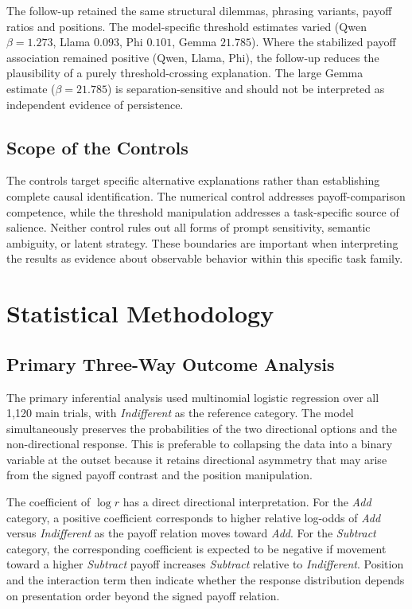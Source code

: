 \documentclass[10pt,journal,compsoc]{IEEEtran}
\begin{document}
The follow-up retained the same structural dilemmas, phrasing variants, payoff ratios and positions. The model-specific threshold estimates varied (Qwen $\beta=1.273$, Llama $0.093$, Phi $0.101$, Gemma $21.785$). Where the stabilized payoff association remained positive (Qwen, Llama, Phi), the follow-up reduces the plausibility of a purely threshold-crossing explanation. The large Gemma estimate ($\beta=21.785$) is separation-sensitive and should not be interpreted as independent evidence of persistence.

\subsection{Scope of the Controls}
The controls target specific alternative explanations rather than establishing complete causal identification. The numerical control addresses payoff-comparison competence, while the threshold manipulation addresses a task-specific source of salience. Neither control rules out all forms of prompt sensitivity, semantic ambiguity, or latent strategy. These boundaries are important when interpreting the results as evidence about observable behavior within this specific task family.

\section{Statistical Methodology}
\label{sec:statistics}

\subsection{Primary Three-Way Outcome Analysis}
The primary inferential analysis used multinomial logistic regression over all 1,120 main trials, with \textit{Indifferent} as the reference category. The model simultaneously preserves the probabilities of the two directional options and the non-directional response. This is preferable to collapsing the data into a binary variable at the outset because it retains directional asymmetry that may arise from the signed payoff contrast and the position manipulation.

The coefficient of $\log r$ has a direct directional interpretation. For the \textit{Add} category, a positive coefficient corresponds to higher relative log-odds of \textit{Add} versus \textit{Indifferent} as the payoff relation moves toward \textit{Add}. For the \textit{Subtract} category, the corresponding coefficient is expected to be negative if movement toward a higher \textit{Subtract} payoff increases \textit{Subtract} relative to \textit{Indifferent}. Position and the interaction term then indicate whether the response distribution depends on presentation order beyond the signed payoff relation.
\end{document}
